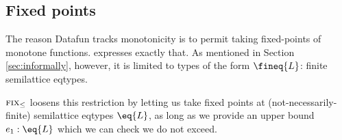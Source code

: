 
\subsection{Fixed points}

The reason Datafun tracks monotonicity is to permit taking fixed-points of
monotone functions.  expresses exactly that. As mentioned in Section
\ref{sec:informally}, however, it is limited to types of the form $\fineq{L}$:
finite semilattice eqtypes.

$\textsc{fix}_\le$ loosens this restriction by letting us take fixed points at
(not-necessarily-finite) semilattice eqtypes $\eq{L}$, as long as we provide an
upper bound $e_1 : \eq{L}$ which we can check we do not exceed.

